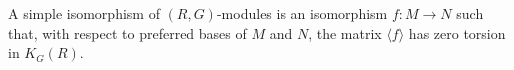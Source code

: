 A simple isomorphism of $(R, G)$-modules is an isomorphism $f: M \to N$ such that, with respect to preferred bases of $M$ and $N$, the matrix $\langle f \rangle$ has zero torsion in $K_G(R)$.

